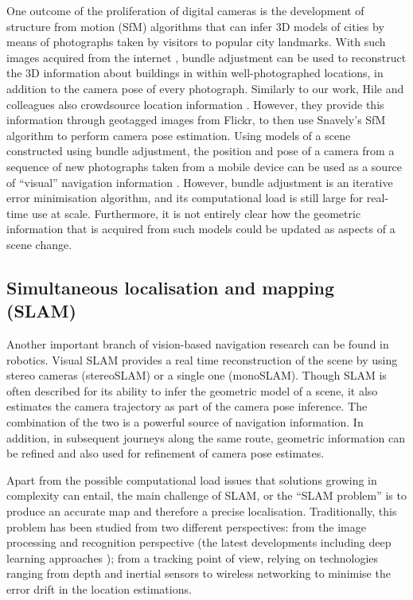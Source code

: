 One outcome of the proliferation of digital cameras is the development of structure from motion (SfM) algorithms that can infer 3D models of cities \citep{agarwal2011building} by means of photographs taken by visitors to popular city landmarks. With such images acquired from the internet \citep{snavely2006photo}, bundle adjustment can be used to reconstruct the 3D information about buildings in within well-photographed locations, in addition to the camera pose of every photograph. Similarly to our work, Hile and colleagues also crowdsource location information \citep{hile2010visual}. However, they provide this information through geotagged images from Flickr, to then use Snavely's SfM algorithm \citep{snavely2006photo} to perform camera pose estimation. Using models of a scene constructed using bundle adjustment, the position and pose of a camera from a sequence of new photographs taken from a mobile device can be used as a source of ``visual'' navigation information \citep{ventura2014global}.  However, bundle adjustment is an iterative error minimisation algorithm, and its computational load is still large for real-time use at scale.  Furthermore, it is not entirely clear how the geometric information that is acquired from such models could be updated as aspects of a scene change.


\subsection{Simultaneous localisation and mapping (SLAM)}

Another important branch of vision-based navigation research can be found in robotics. Visual SLAM \citep{konolige2007frame,engelhard2011real,neira2008guest} provides a real time reconstruction of the scene by using stereo cameras (stereoSLAM) or a single one (monoSLAM). Though SLAM is often described for its ability to infer the geometric model of a scene, it also estimates the camera trajectory as part of the camera pose inference. The combination of the two is a powerful source of navigation information. In addition, in subsequent journeys along the same route, geometric information can be refined and also used for refinement of camera pose estimates.

Apart from the possible computational load issues that solutions growing in complexity can entail, the main challenge of SLAM, or the ``SLAM problem'' is to produce an accurate map and therefore a precise localisation. Traditionally, this problem has been studied from two different perspectives: from the image processing and recognition perspective (the latest developments including deep learning approaches \citep{chen2014convolutional}); from a tracking point of view, relying on technologies ranging from depth and inertial sensors to wireless networking to minimise the error drift in the location estimations.

